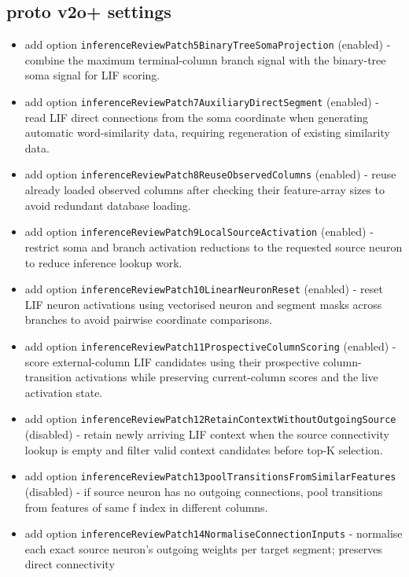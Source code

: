 \subsection{proto v2o+ settings}
\begin{itemize}
	\item add option \texttt{inferenceReviewPatch5BinaryTreeSomaProjection} (enabled) - combine the maximum terminal-column branch signal with the binary-tree soma signal for LIF scoring.
	\item add option \texttt{inferenceReviewPatch7AuxiliaryDirectSegment} (enabled) - read LIF direct connections from the soma coordinate when generating automatic word-similarity data, requiring regeneration of existing similarity data.
	\item add option \texttt{inferenceReviewPatch8ReuseObservedColumns} (enabled) - reuse already loaded observed columns after checking their feature-array sizes to avoid redundant database loading.
	\item add option \texttt{inferenceReviewPatch9LocalSourceActivation} (enabled) - restrict soma and branch activation reductions to the requested source neuron to reduce inference lookup work.
	\item add option \texttt{inferenceReviewPatch10LinearNeuronReset} (enabled) - reset LIF neuron activations using vectorised neuron and segment masks across branches to avoid pairwise coordinate comparisons.
	\item add option \texttt{inferenceReviewPatch11ProspectiveColumnScoring} (enabled) - score external-column LIF candidates using their prospective column-transition activations while preserving current-column scores and the live activation state.
	\item add option \texttt{inferenceReviewPatch12RetainContextWithoutOutgoingSource} (disabled) - retain newly arriving LIF context when the source connectivity lookup is empty and filter valid context candidates before top-K selection.
	\item add option \texttt{inferenceReviewPatch13poolTransitionsFromSimilarFeatures} (disabled) - if source neuron has no outgoing connections, pool transitions from features of same f index in different columns.
	\item add option \texttt{inferenceReviewPatch14NormaliseConnectionInputs} - normalise each exact source neuron's outgoing weights per target segment; preserves direct connectivity
\end{itemize}

